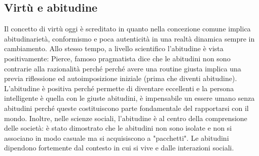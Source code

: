 \documentclass[10pt,a4paper]{article}
\begin{document}
\subsection{Virtù e abitudine}
Il concetto di virtù oggi è screditato in quanto nella concezione comune implica abitudinarietà, conformismo e poca autenticità in una realtà dinamica sempre in cambiamento. Allo stesso tempo, a livello scientifico l'abitudine è vista positivamente: Pierce, famoso pragmatista dice che le abitudini non sono contrarie alla razionalità perché perché avere una routine giusta implica una previa riflessione ed autoimposizione iniziale (prima che diventi abitudine). L'abitudine è positiva perché permette di diventare eccellenti e la persona intelligente è quella con le giuste abitudini, è impensabile un essere umano senza abitudini perché queste costituiscono parte fondamentale del rapportarsi con il mondo. Inoltre, nelle scienze sociali, l'abitudine è al centro della comprensione delle società: è stato dimostrato che le abitudini non sono isolate e non si associano in modo casuale ma si acquisiscono a "pacchetti". Le abitudini dipendono fortemente dal contesto in cui si vive e dalle interazioni sociali.\\
\end{document}

